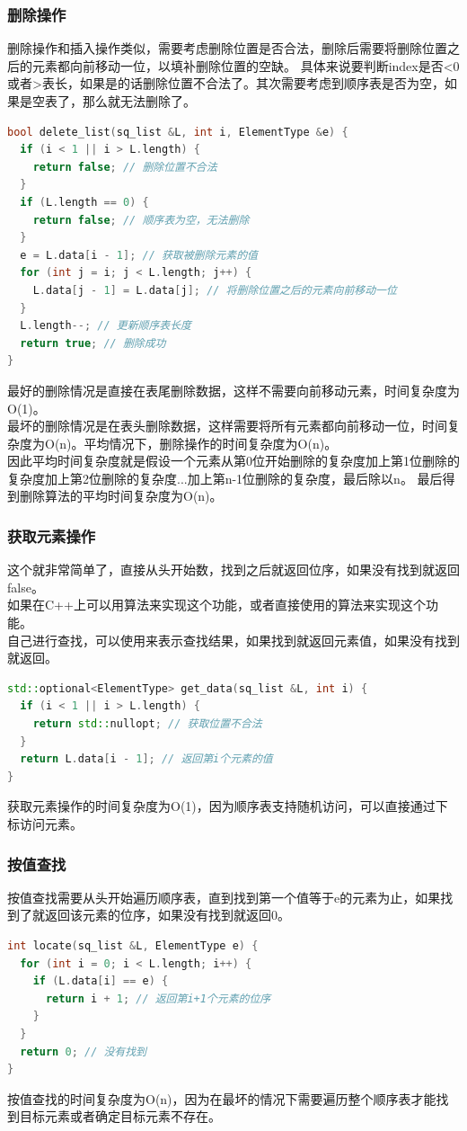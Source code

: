 \documentclass[b5paper,11pt]{article}
\begin{document}
\subsubsection{删除操作}
删除操作和插入操作类似，需要考虑删除位置是否合法，删除后需要将删除位置之后的元素都向前移动一位，以填补删除位置的空缺。
具体来说要判断index是否<0或者>表长，如果是的话删除位置不合法了。其次需要考虑到顺序表是否为空，如果是空表了，那么就无法删除了。
\begin{lstlisting}[language=C++]
bool delete_list(sq_list &L, int i, ElementType &e) {
  if (i < 1 || i > L.length) {
    return false; // 删除位置不合法
  }
  if (L.length == 0) {
    return false; // 顺序表为空，无法删除
  }
  e = L.data[i - 1]; // 获取被删除元素的值
  for (int j = i; j < L.length; j++) {
    L.data[j - 1] = L.data[j]; // 将删除位置之后的元素向前移动一位
  }
  L.length--; // 更新顺序表长度
  return true; // 删除成功
}
\end{lstlisting}
最好的删除情况是直接在表尾删除数据，这样不需要向前移动元素，时间复杂度为O(1)。 \\
最坏的删除情况是在表头删除数据，这样需要将所有元素都向前移动一位，时间复杂度为O(n)。平均情况下，删除操作的时间复杂度为O(n)。 \\
因此平均时间复杂度就是假设一个元素从第0位开始删除的复杂度加上第1位删除的复杂度加上第2位删除的复杂度...加上第n-1位删除的复杂度，最后除以n。
最后得到删除算法的平均时间复杂度为O(n)。

\subsubsection{获取元素操作}

这个就非常简单了，直接从头开始数，找到之后就返回位序，如果没有找到就返回false。 \\
如果在C++上可以用算法来实现这个功能，或者直接使用的算法来实现这个功能。
\\
自己进行查找，可以使用来表示查找结果，如果找到就返回元素值，如果没有找到就返回。
\begin{lstlisting}[language=C++]
std::optional<ElementType> get_data(sq_list &L, int i) {
  if (i < 1 || i > L.length) {
    return std::nullopt; // 获取位置不合法
  }
  return L.data[i - 1]; // 返回第i个元素的值
}
\end{lstlisting}
获取元素操作的时间复杂度为O(1)，因为顺序表支持随机访问，可以直接通过下标访问元素。

\subsubsection{按值查找}
按值查找需要从头开始遍历顺序表，直到找到第一个值等于e的元素为止，如果找到了就返回该元素的位序，如果没有找到就返回0。
\begin{lstlisting}[language=C++]
int locate(sq_list &L, ElementType e) {
  for (int i = 0; i < L.length; i++) {
    if (L.data[i] == e) {
      return i + 1; // 返回第i+1个元素的位序
    }
  }
  return 0; // 没有找到
}
\end{lstlisting}
按值查找的时间复杂度为O(n)，因为在最坏的情况下需要遍历整个顺序表才能找到目标元素或者确定目标元素不存在。
\end{document}

